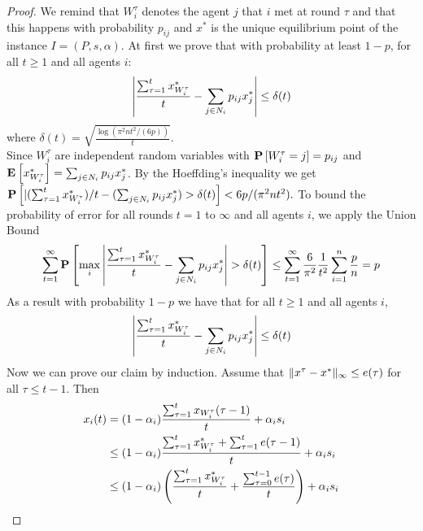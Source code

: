 \begin{proof}
We remind that $W_i^\tau$ denotes the agent
$j$ that $i$ met at round $\tau$ and that this happens 
with probability $p_{ij}$ and $x^*$ is the unique equilibrium point 
of the instance $I=(P,s,\alpha)$. At first we prove that
with probability at least $1-p$, for all $t \geq 1$ and all agents $i$:
\begin{equation}\label{eq:error_per_round}
    \left|
    \frac{\sum_{\tau=1}^t x^*_{W_i^\tau}}{t} -
    \sum_{j \in N_i} p_{ij} x^*_j
    \right| \leq \delta(t)
\end{equation}
where $\delta(t) = \sqrt{ \frac{\log(\pi^2 n t^2/(6 p))}{t}}$.\\
Since $W_i^\tau$ are independent random variables with 
$\bm{\mathrm{P}}\left[W_i^\tau = j\right]=p_{ij}$ and \(\Exp{x^*_{W_i^\tau}} = \sum_{j \in N_i} p_{ij} x^*_j\).
By the Hoeffding's inequality we get
  \(
    \bm{\mathrm{P}}\left[
      |
      {(\sum_{\tau = 1}^{t} x^*_{W_i^\tau}})/{t}
      - (\sum_{j \in N_i} p_{ij} x^*_j)
      > \delta(t)
    \right]
    < 6 p / (\pi^2 n t^2).
  \)
To bound the probability of error for all rounds $t=1$ to $\infty$
and all agents $i$, we apply the Union Bound
  \begin{align*}
    \sum_{t=1}^{\infty}
    \bm{\mathrm{P}}\left[ \max_{i}
      \left|
      \frac{\sum_{\tau = 1}^{t} x^*_{W_i^{\tau}}}{t}
      - \sum_{j \in N_i} p_{ij} x^*_j \right|
      > \delta(t)\right]
    \leq
    \sum_{t=1}^{\infty} \frac{6}{\pi^2} \frac{1}{t^2} \sum_{i=1}^n \frac{p}{n} =
    p
  \end{align*}
\noindent As a result with probability $1-p$ we have that for all $t\geq 1$ and all agents $i$,
  \begin{equation}\label{eq:error_per_round}
    \left|
    \frac{\sum_{\tau=1}^t x^*_{W_i^\tau}}{t} -
    \sum_{j \in N_i} p_{ij} x^*_j
    \right| \leq \delta(t)
  \end{equation}
\noindent Now we can prove our claim by induction. Assume that $\| x^{\tau}-x^* \|_{\infty} \leq e(\tau)$ for all 
$\tau \leq t-1$. Then 
\begin{align}
    x_i(t)
    &=
    (1-\alpha_i)\frac{\sum_{\tau=1}^{t}x_{W_i^{\tau}}(\tau-1)}{t}
    + \alpha_i s_i \nonumber \\
    &\leq
    (1-\alpha_i)\frac{\sum_{\tau=1}^{t}x^*_{W_i^{\tau}} +
      \sum_{\tau=1}^{t} e(\tau-1)}{t} + \alpha_i s_i \label{step:induction_step}\\
    &\leq
    (1-\alpha_i)
    \lp(
    \frac{\sum_{\tau=1}^{t}x^*_{W_i^{\tau}}}{t}+
    \frac{\sum_{\tau=0}^{t-1} e(\tau)}{t}
    \rp)
    + \alpha_i s_i \nonumber\\

\end{align}
\end{proof}
